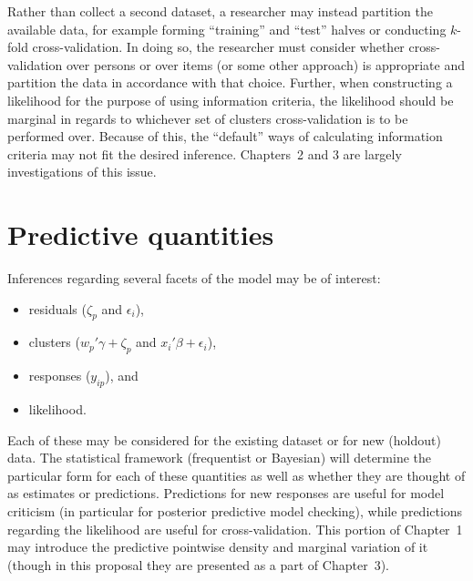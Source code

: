 Rather than collect a second dataset, a researcher may instead partition the available data, for example forming ``training'' and ``test'' halves or conducting $k$-fold cross-validation. In doing so, the researcher must consider whether cross-validation over persons or over items (or some other approach) is appropriate and partition the data in accordance with that choice.
Further, when constructing a likelihood for the purpose of using information criteria, the likelihood should be marginal in regards to whichever set of clusters cross-validation is to be performed over. Because of this, the ``default'' ways of calculating information criteria may not fit the desired inference. Chapters~2 and 3 are largely investigations of this issue.

\section{Predictive quantities}

Inferences regarding several facets of the model may be of interest:
\begin{itemize}
	\item residuals ($\zeta_p$ and $\epsilon_i$),
	\item clusters ($w_p'\gamma + \zeta_p$ and $x_i'\beta + \epsilon_i$),
	\item responses ($y_{ip}$), and
	\item likelihood.
\end{itemize}
Each of these may be considered for the existing dataset or for new (holdout) data. The statistical framework (frequentist or Bayesian) will determine the particular form for each of these quantities as well as whether they are thought of as estimates or predictions. Predictions for new responses are useful for model criticism (in particular for posterior predictive model checking), while predictions regarding the likelihood are useful for cross-validation. This portion of Chapter~1 may introduce the predictive pointwise density and marginal variation of it (though in this proposal they are presented as a part of Chapter~3).
